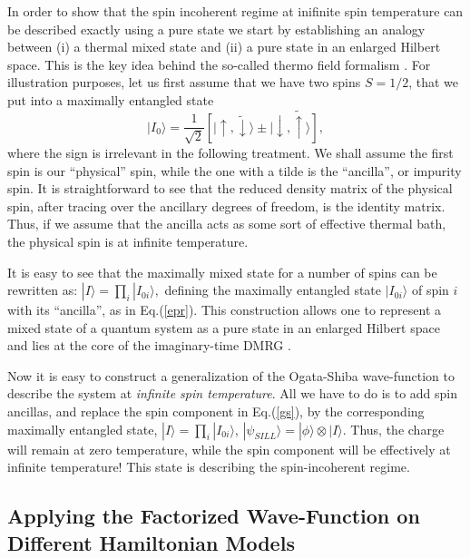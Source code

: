 \documentclass[article,11pt]{revtex4}
\begin{document}
In order to show that the spin incoherent regime at inifinite spin temperature can be described exactly using a pure state we start by establishing an analogy between (i) a thermal mixed state and (ii) a pure state in an enlarged Hilbert space.  This is the key idea behind the so-called thermo field formalism \cite{Takahashi1975}. 
For illustration purposes, let us first assume that we have two spins $S=1/2$, that we put  into
a maximally entangled state
\begin{equation}
|I_0\rangle = \frac{1}{\sqrt{2}}
\left[|\uparrow,\tilde\downarrow\rangle \pm |\downarrow,\tilde\uparrow\rangle\right],
\label{epr}
\end{equation}
where the sign is irrelevant in the following treatment. We shall assume the first spin is our ``physical'' spin, while the one with a tilde is the ``ancilla'', or impurity spin. It is straightforward to see that the reduced density matrix of the physical spin, after tracing over the ancillary degrees of freedom, is the identity matrix.  Thus, if we assume that the ancilla acts as some sort of effective thermal bath, the physical spin is at infinite temperature.

It is easy to see that the maximally mixed state for a number of spins can be rewritten as:
$|I \rangle = \prod_i |I_{0i}\rangle,$
defining the maximally entangled state $|I_{0i}\rangle$ of spin $i$ with
its ``ancilla'', as in Eq.(\ref{epr}).
This construction allows one to represent a mixed state of a quantum system as a pure state in an enlarged Hilbert space
and lies at the core of the imaginary-time DMRG \cite{Feiguin2005a}.

Now it is easy to construct a generalization of the Ogata-Shiba wave-function to describe the system at {\it infinite spin temperature}. All we have to do is to add spin ancillas, and replace the spin component in Eq.(\ref{gs}), by the corresponding maximally entangled state, $|I \rangle = \prod_i |I_{0i}\rangle$, $|\psi_{SILL}\rangle=|\phi\rangle \otimes |I\rangle$. Thus, the charge will remain at zero temperature, while the spin component will be effectively at infinite temperature! This state is describing the spin-incoherent regime.

\subsection {Applying the Factorized Wave-Function on Different Hamiltonian Models}
\end{document}
